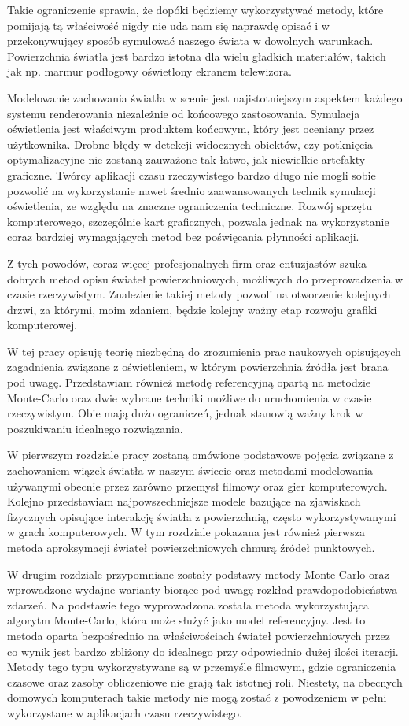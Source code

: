 \documentclass[../main.tex]{subfiles}
\begin{document}
Takie ograniczenie sprawia, że dopóki będziemy wykorzystywać metody, które pomijają tą właściwość nigdy nie uda nam się naprawdę opisać i w przekonywujący sposób symulować naszego świata w dowolnych warunkach. Powierzchnia światła jest bardzo istotna dla wielu gładkich materiałów, takich jak np. marmur podłogowy oświetlony ekranem telewizora.

Modelowanie zachowania światła w scenie jest najistotniejszym aspektem każdego systemu renderowania niezależnie od końcowego zastosowania.
Symulacja oświetlenia jest właściwym produktem końcowym, który jest oceniany przez użytkownika. Drobne błędy w detekcji widocznych obiektów, czy potknięcia optymalizacyjne nie zostaną zauważone tak łatwo, jak niewielkie artefakty graficzne. Twórcy aplikacji czasu rzeczywistego bardzo długo nie mogli sobie pozwolić na wykorzystanie nawet średnio zaawansowanych technik symulacji oświetlenia, ze względu na znaczne ograniczenia techniczne. Rozwój sprzętu komputerowego, szczególnie kart graficznych, pozwala jednak na wykorzystanie coraz bardziej wymagających metod bez poświęcania płynności aplikacji.

Z tych powodów, coraz więcej profesjonalnych firm oraz entuzjastów szuka dobrych metod opisu świateł powierzchniowych, możliwych do przeprowadzenia w czasie rzeczywistym. Znalezienie takiej metody pozwoli na otworzenie kolejnych drzwi, za którymi, moim zdaniem, będzie kolejny ważny etap rozwoju grafiki komputerowej.

W tej pracy opisuję teorię niezbędną do zrozumienia prac naukowych opisujących zagadnienia związane z oświetleniem, w którym powierzchnia źródła jest brana pod uwagę. Przedstawiam również metodę referencyjną opartą na metodzie Monte-Carlo oraz dwie wybrane techniki możliwe do uruchomienia w czasie rzeczywistym. Obie mają dużo ograniczeń, jednak stanowią ważny krok w poszukiwaniu idealnego rozwiązania.

W pierwszym rozdziale pracy zostaną omówione podstawowe pojęcia związane z zachowaniem wiązek światła w naszym świecie oraz metodami modelowania używanymi obecnie przez zarówno przemysł filmowy oraz gier komputerowych. Kolejno przedstawiam najpowszechniejsze modele bazujące na zjawiskach fizycznych opisujące interakcję światła z powierzchnią, często wykorzystywanymi w grach komputerowych. W tym rozdziale pokazana jest również pierwsza metoda aproksymacji świateł powierzchniowych chmurą źródeł punktowych.

W drugim rozdziale przypomniane zostały podstawy metody Monte-Carlo oraz wprowadzone wydajne warianty biorące pod uwagę rozkład prawdopodobieństwa zdarzeń. Na podstawie tego wyprowadzona została metoda wykorzystująca algorytm Monte-Carlo, która może służyć jako model referencyjny. Jest to metoda oparta bezpośrednio na właściwościach świateł powierzchniowych przez co wynik jest bardzo zbliżony do idealnego przy odpowiednio dużej ilości iteracji. Metody tego typu wykorzystywane są w przemyśle filmowym, gdzie ograniczenia czasowe oraz zasoby obliczeniowe nie grają tak istotnej roli. Niestety, na obecnych domowych komputerach takie metody nie mogą zostać z powodzeniem w pełni wykorzystane w aplikacjach czasu rzeczywistego.
\end{document}
